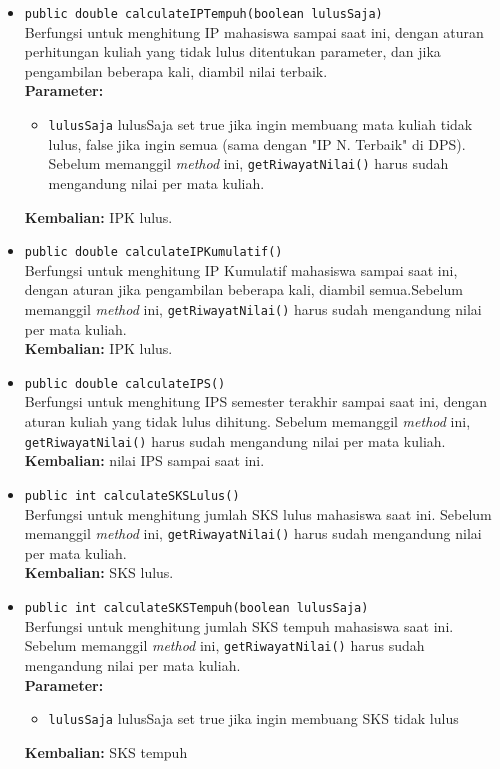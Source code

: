 \begin{itemize}
	\item \texttt{public double calculateIPTempuh(boolean lulusSaja)}\\
	Berfungsi untuk menghitung IP mahasiswa sampai saat ini, dengan aturan perhitungan kuliah yang tidak lulus ditentukan parameter, dan jika pengambilan beberapa kali, diambil nilai terbaik.\\
        \textbf{Parameter:}
		\begin{itemize}
			\item \texttt{lulusSaja} lulusSaja set true jika ingin membuang mata kuliah tidak lulus, false jika ingin semua (sama dengan "IP N. Terbaik" di DPS). Sebelum memanggil \textit{method} ini, \texttt{getRiwayatNilai()} harus sudah mengandung nilai per mata kuliah.
		\end{itemize}
		\textbf{Kembalian:} IPK lulus.
		
	\item \texttt{public double calculateIPKumulatif()}\\
	Berfungsi untuk menghitung IP Kumulatif mahasiswa sampai saat ini, dengan aturan jika pengambilan beberapa kali, diambil semua.Sebelum memanggil \textit{method} ini, \texttt{getRiwayatNilai()} harus sudah mengandung nilai per mata kuliah.\\
		\textbf{Kembalian:} IPK lulus.
		
	\item \texttt{public double calculateIPS()}\\
		Berfungsi untuk menghitung IPS semester terakhir sampai saat ini, dengan aturan kuliah yang tidak lulus dihitung. Sebelum memanggil \textit{method} ini, \texttt{getRiwayatNilai()} harus sudah mengandung nilai per mata kuliah.\\
		\textbf{Kembalian:}  nilai IPS sampai saat ini.
		
	\item \texttt{public int calculateSKSLulus()}\\
		Berfungsi untuk menghitung jumlah SKS lulus mahasiswa saat ini. Sebelum memanggil \textit{method} ini, \texttt{getRiwayatNilai()} harus sudah mengandung nilai per mata kuliah.\\
		\textbf{Kembalian:} SKS lulus.
		
	\item \texttt{public int calculateSKSTempuh(boolean lulusSaja)}\\
		Berfungsi untuk menghitung jumlah SKS tempuh mahasiswa saat ini. Sebelum memanggil \textit{method} ini, \texttt{getRiwayatNilai()} harus sudah mengandung nilai per mata kuliah.\\
        \textbf{Parameter:}
		\begin{itemize}
			\item \texttt{lulusSaja} lulusSaja set true jika ingin membuang SKS tidak lulus
		\end{itemize}
		\textbf{Kembalian:} SKS tempuh
		

\end{itemize}
